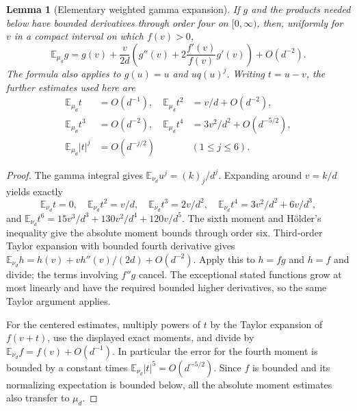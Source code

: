 \documentclass[11pt]{article}
\newtheorem{lemma}[theorem]{Lemma}
\theoremstyle{definition}
\theoremstyle{remark}
\begin{document}
\begin{lemma}[Elementary weighted gamma expansion]
\label{lem:f2v92-gamma}
If \(g\) and the products needed below have bounded derivatives
through order four on \([0,\infty)\), then, uniformly for \(v\)
in a compact interval on which \(f(v)>0\),
\begin{equation}
 \mathbb E_{\mu_d}g
 =g(v)+\frac{v}{2d}
     \left(g''(v)+2\frac{f'(v)}{f(v)}g'(v)\right)+O(d^{-2}).
 \label{eq:f2v92-gamma}
\end{equation}
The formula also applies to \(g(u)=u\) and \(u q(u)^j\).
Writing \(t=u-v\), the further estimates used here are
\begin{equation}
\begin{aligned}
 \mathbb E_{\mu_d}t&=O(d^{-1}),&
 \mathbb E_{\mu_d}t^2&=v/d+O(d^{-2}),\\
 \mathbb E_{\mu_d}t^3&=O(d^{-2}),&
 \mathbb E_{\mu_d}t^4&=3v^2/d^2+O(d^{-5/2}),\\
 \mathbb E_{\mu_d}|t|^j&=O(d^{-j/2})&& (1\le j\le6).
\end{aligned}
 \label{eq:f2v92-centered}
\end{equation}
\end{lemma}

\begin{proof}
The gamma integral gives
\(\mathbb E_{\nu_d}u^j=(k)_j/d^j\).  Expanding around
\(v=k/d\) yields exactly
\[
 \mathbb E_{\nu_d}t=0,\quad
 \mathbb E_{\nu_d}t^2=v/d,\quad
 \mathbb E_{\nu_d}t^3=2v/d^2,\quad
 \mathbb E_{\nu_d}t^4=3v^2/d^2+6v/d^3,
\]
and
\(\mathbb E_{\nu_d}t^6=15v^3/d^3+130v^2/d^4+120v/d^5\).
The sixth moment and H\"older's inequality give the absolute moment
bounds through order six.  Third-order Taylor expansion with bounded
fourth derivative gives
\(\mathbb E_{\nu_d}h=h(v)+vh''(v)/(2d)+O(d^{-2})\).
Apply this to \(h=fg\) and \(h=f\) and divide; the terms
involving \(f''g\) cancel.  The exceptional stated functions grow
at most linearly and have the required bounded higher derivatives, so
the same Taylor argument applies.

For the centered estimates, multiply powers of \(t\) by the Taylor
expansion of \(f(v+t)\), use the displayed exact moments, and divide
by \(\mathbb E_{\nu_d}f=f(v)+O(d^{-1})\).  In particular the
error for the fourth moment is bounded by a constant times
\(\mathbb E_{\nu_d}|t|^5=O(d^{-5/2})\).  Since \(f\) is
bounded and its normalizing expectation is bounded below, all the
absolute moment estimates also transfer to \(\mu_d\).
\end{proof}
\end{document}
